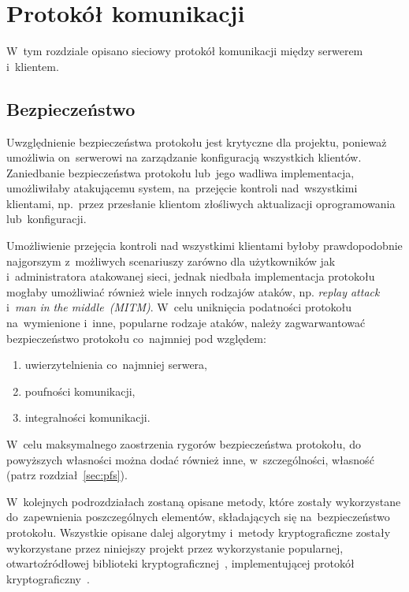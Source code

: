 \documentclass[thesis]{subfiles}
\begin{document}
\chapter{Protokół komunikacji}
\label{chapter:protokol}

W~tym rozdziale opisano sieciowy protokół komunikacji między serwerem i~klientem.

\section{Bezpieczeństwo}

Uwzględnienie bezpieczeństwa protokołu jest krytyczne dla projektu, ponieważ umożliwia on~serwerowi na zarządzanie konfiguracją wszystkich klientów. Zaniedbanie bezpieczeństwa protokołu lub~jego wadliwa implementacja, umożliwiłaby atakującemu system, na~przejęcie kontroli nad~wszystkimi klientami, np.~przez przesłanie klientom złośliwych aktualizacji oprogramowania lub~konfiguracji.

Umożliwienie przejęcia kontroli nad wszystkimi klientami byłoby prawdopodobnie najgorszym z~możliwych scenariuszy zarówno dla użytkowników jak i~administratora atakowanej sieci, jednak niedbała implementacja protokołu mogłaby umożliwiać również wiele innych rodzajów ataków, np. \emph{replay attack} i~\emph{man in the middle~(MITM)}. W~celu uniknięcia podatności protokołu na~wymienione i~inne, popularne rodzaje ataków, należy zagwarwantować bezpieczeństwo protokołu co~najmniej pod względem:
\begin{enumerate}
\item uwierzytelnienia co~najmniej serwera,
\item poufności komunikacji,
\item integralności komunikacji.
\end{enumerate}
W~celu maksymalnego zaostrzenia rygorów bezpieczeństwa protokołu, do powyższych własności można dodać również inne, w~szczególności, własność  (patrz rozdział~\ref{sec:pfs}).

W~kolejnych podrozdziałach zostaną opisane metody, które zostały wykorzystane do~zapewnienia poszczególnych elementów, składających się na~bezpieczeństwo protokołu. Wszystkie opisane dalej algorytmy i~metody kryptograficzne zostały wykorzystane przez niniejszy projekt przez wykorzystanie popularnej, otwartoźródłowej biblioteki kryptograficznej~, implementującej protokół kryptograficzny~.
\end{document}
